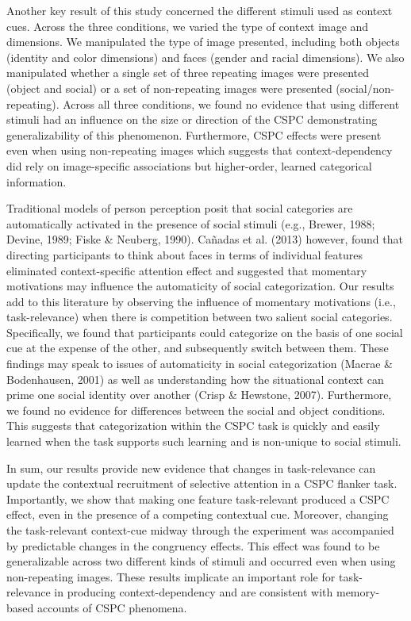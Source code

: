 \documentclass[english,,man,floatsintext]{apa6}
\begin{document}
Another key result of this study concerned the different stimuli used as
context cues. Across the three conditions, we varied the type of context
image and dimensions. We manipulated the type of image presented,
including both objects (identity and color dimensions) and faces (gender
and racial dimensions). We also manipulated whether a single set of
three repeating images were presented (object and social) or a set of
non-repeating images were presented (social/non-repeating). Across all
three conditions, we found no evidence that using different stimuli had
an influence on the size or direction of the CSPC demonstrating
generalizability of this phenomenon. Furthermore, CSPC effects were
present even when using non-repeating images which suggests that
context-dependency did rely on image-specific associations but
higher-order, learned categorical information.

Traditional models of person perception posit that social categories are
automatically activated in the presence of social stimuli (e.g., Brewer,
1988; Devine, 1989; Fiske \& Neuberg, 1990). Cañadas et al. (2013)
however, found that directing participants to think about faces in terms
of individual features eliminated context-specific attention effect and
suggested that momentary motivations may influence the automaticity of
social categorization. Our results add to this literature by observing
the influence of momentary motivations (i.e., task-relevance) when there
is competition between two salient social categories. Specifically, we
found that participants could categorize on the basis of one social cue
at the expense of the other, and subsequently switch between them. These
findings may speak to issues of automaticity in social categorization
(Macrae \& Bodenhausen, 2001) as well as understanding how the
situational context can prime one social identity over another (Crisp \&
Hewstone, 2007). Furthermore, we found no evidence for differences
between the social and object conditions. This suggests that
categorization within the CSPC task is quickly and easily learned when
the task supports such learning and is non-unique to social stimuli.

In sum, our results provide new evidence that changes in task-relevance
can update the contextual recruitment of selective attention in a CSPC
flanker task. Importantly, we show that making one feature task-relevant
produced a CSPC effect, even in the presence of a competing contextual
cue. Moreover, changing the task-relevant context-cue midway through the
experiment was accompanied by predictable changes in the congruency
effects. This effect was found to be generalizable across two different
kinds of stimuli and occurred even when using non-repeating images.
These results implicate an important role for task-relevance in
producing context-dependency and are consistent with memory-based
accounts of CSPC phenomena.
\end{document}

